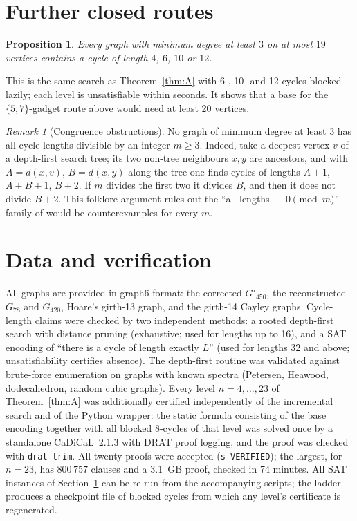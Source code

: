 \documentclass[11pt]{article}
\newtheorem{proposition}[theorem]{Proposition}
\theoremstyle{remark}
\newtheorem{remark}[theorem]{Remark}
\theoremstyle{definition}
\begin{document}
\section{Further closed routes}\label{sec:closed}

\begin{proposition}
Every graph with minimum degree at least $3$ on at most $19$ vertices contains a cycle of length $4$, $6$, $10$ or $12$.
\end{proposition}
This is the same search as Theorem~\ref{thm:A} with 6-, 10- and 12-cycles blocked lazily; each level is unsatisfiable within seconds. It shows that a base for the $\{5,7\}$-gadget route above would need at least 20 vertices.

\begin{remark}[Congruence obstructions]
No graph of minimum degree at least 3 has all cycle lengths divisible by an integer $m\ge 3$. Indeed, take a deepest vertex $v$ of a depth-first search tree; its two non-tree neighbours $x,y$ are ancestors, and with $A=d(x,v)$, $B=d(x,y)$ along the tree one finds cycles of lengths $A+1$, $A+B+1$, $B+2$. If $m$ divides the first two it divides $B$, and then it does not divide $B+2$. This folklore argument rules out the ``all lengths $\equiv 0 \pmod m$'' family of would-be counterexamples for every $m$.
\end{remark}

\section{Data and verification}\label{sec:data}

All graphs are provided in graph6 format: the corrected $G'_{450}$, the reconstructed $G_{78}$ and $G_{420}$, Hoare's girth-13 graph, and the girth-14 Cayley graphs. Cycle-length claims were checked by two independent methods: a rooted depth-first search with distance pruning (exhaustive; used for lengths up to 16), and a SAT encoding of ``there is a cycle of length exactly $L$'' (used for lengths 32 and above; unsatisfiability certifies absence). The depth-first routine was validated against brute-force enumeration on graphs with known spectra (Petersen, Heawood, dodecahedron, random cubic graphs). Every level $n=4,\dots,23$ of Theorem~\ref{thm:A} was additionally certified independently of the incremental search and of the Python wrapper: the static formula consisting of the base encoding together with all blocked 8-cycles of that level was solved once by a standalone CaDiCaL~2.1.3 with DRAT proof logging, and the proof was checked with \texttt{drat-trim}. All twenty proofs were accepted (\texttt{s VERIFIED}); the largest, for $n=23$, has $800\,757$ clauses and a 3.1~GB proof, checked in 74 minutes. All SAT instances of Section~\ref{sec:closed} can be re-run from the accompanying scripts; the ladder produces a checkpoint file of blocked cycles from which any level's certificate is regenerated.
\end{document}
